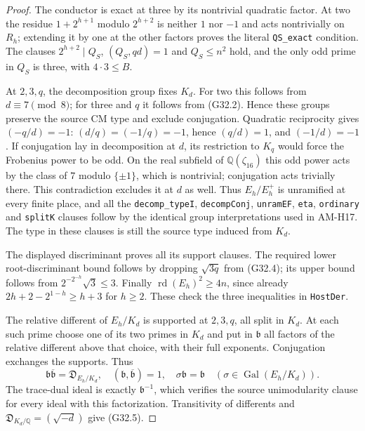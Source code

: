 \begin{proof}
The conductor is exact at three by its nontrivial quadratic
factor.  At two the residue $1+2^{h+1}$ modulo
$2^{h+2}$ is neither $1$ nor $-1$ and acts nontrivially
on $R_h$; extending it by one at the other factors proves
the literal \texttt{QS\_exact} condition.  The clauses
$2^{h+2}\mid Q_S$, $(Q_S,qd)=1$ and $Q_S\leq n^2$
hold, and the only odd prime in $Q_S$ is three, with
$4\cdot3\leq B$.

At $2,3,q$, the decomposition group fixes $K_d$.
For two this follows from $d\equiv7\pmod8$; for three
and $q$ it follows from (G32.2).  Hence these groups
preserve the source CM type and exclude conjugation.
Quadratic reciprocity gives $(-q/d)=-1$:
$(d/q)=(-1/q)=-1$, hence $(q/d)=1$, and $(-1/d)=-1$.
If conjugation lay in decomposition at $d$, its restriction
to $K_q$ would force the Frobenius power to be odd.
On the real subfield of $\mathbb Q(\zeta_{16})$ this
odd power acts by the class of $7$ modulo $\{\pm1\}$,
which is nontrivial; conjugation acts trivially there.
This contradiction excludes it at $d$ as well.
Thus $E_h/E_h^+$ is unramified at every finite place,
and all the \texttt{decomp\_typeI}, \texttt{decompConj},
\texttt{unramEF}, \texttt{eta}, \texttt{ordinary} and
\texttt{splitK} clauses follow by the identical group
interpretations used in AM-H17.  The type in these
clauses is still the source type induced from $K_d$.

The displayed discriminant proves all its support clauses.
The required lower root-discriminant bound follows by
dropping $\sqrt{3q}$ from (G32.4); its upper bound follows
from
$2^{-2^{-h}}\sqrt3\leq3$.
Finally $\operatorname{rd}(E_h)^2\geq4n$, since already
$2h+2-2^{1-h}\geq h+3$ for $h\geq2$.
These check the three inequalities in \texttt{HostDer}.

The relative different of $E_h/K_d$ is supported at
$2,3,q$, all split in $K_d$.  At each such prime choose
one of its two primes in $K_d$ and put in $\mathfrak b$
all factors of the relative different above that choice,
with their full exponents.  Conjugation exchanges the
supports.  Thus
\[
 \mathfrak b\overline{\mathfrak b}=\mathfrak D_{E_h/K_d},
 \quad(\mathfrak b,\overline{\mathfrak b})=1,
 \quad \sigma\mathfrak b=\mathfrak b
                  \quad(\sigma\in\operatorname{Gal}(E_h/K_d)).
\]
The trace-dual ideal is exactly $\mathfrak b^{-1}$,
which verifies the source unimodularity clause for every
ideal with this factorization.  Transitivity of differents
and $\mathfrak D_{K_d/\mathbb Q}=(\sqrt{-d})$ give
(G32.5).


\end{proof}
